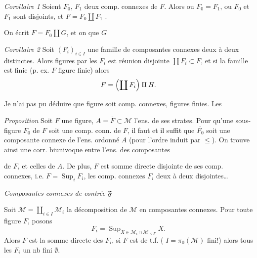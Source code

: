 \documentclass[11pt,a4paper]{article}
\begin{document}
\emph{Corollaire 1} \quad {} Soient $F_0$, $F_1$ deux comp. connexes de $F$. Alors ou $F_0 = F_1$, ou $F_0$ et $F_1$ sont disjoints, et \struck{\ill{}}  $F = F_0 \amalg F_1$ .

On écrit $F = F_0 \amalg G$, et on \ill{} que $G$ \ill{}

\emph{Corollaire 2} \quad Soit $(F_i)_{i \in I}$ une famille de composantes connexes deux à deux distinctes. Alors  \ill{} figures \ill{} par les $F_i$ est \ill{} réunion disjointe $\coprod F_i \subset F$, et si la famille est finie (p. ex. $F$  figure finie) alors
\[
  F = \Bigl(\coprod F_i\Bigr) \amalg H .
\]

Je n'ai pas pu déduire que \struck{\ill{}} figure \ill{} soit \struck{\ill{}} \ill{} comp. connexes,  figures finies. Les

\emph{Proposition} \quad Soit $F$ une figure, $A = \overline{F} \subset \mathcal{M}$ l'ens. de ses strates.  Pour qu'une sous-figure  $F_0$ de $F$ soit une comp. conn. de $F$, il faut et il suffit que $\overline{F_0}$ soit une composante connexe de l'ens. ordonné $A$ (pour l'ordre induit par $\leq$). On trouve ainsi une corr. biunivoque entre l'ens. des composantes

de $F$, et celles de $A$. De plus, $F$ est somme directe disjointe de ses comp. connexes, i.e. $F = \operatorname{Sup}_i F_i$, les comp. connexes $F_i$ deux à deux disjointes…

\emph{Composantes connexes de  contrée $\mathfrak{F}$}

Soit $\mathcal{M} = \coprod_{i \in I} \mathcal{M}_i$ la décomposition de $\mathcal{M}$ en composantes connexes. Pour toute figure $F$, posons
\[
  F_i = \operatorname{Sup}_{X \in \mathcal{M}_i \cap \mathcal{M}_{\leq F}} X .
\]
Alors $F$ est la somme directe des $F_i$, \struck{\ill{}} si $F$ est de t.f. ( $I = \pi_0(\mathcal{M})$ fini!) alors tous les $F_i$  un nb fini \struck{\ill{}} $\emptyset$.
\end{document}
